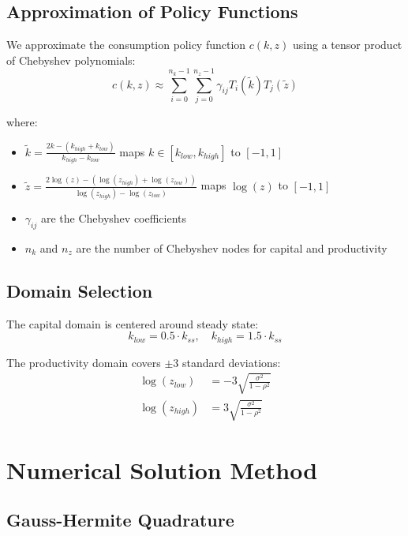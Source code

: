 \documentclass[11pt]{article}
\theoremstyle{definition}
\begin{document}
\subsection{Approximation of Policy Functions}

We approximate the consumption policy function $c(k, z)$ using a tensor product of Chebyshev polynomials:
\begin{equation}
c(k, z) \approx \sum_{i=0}^{n_k-1} \sum_{j=0}^{n_z-1} \gamma_{ij} T_i(\tilde{k}) T_j(\tilde{z})
\end{equation}

where:
\begin{itemize}[leftmargin=*, itemsep=0.1em]
\item $\tilde{k} = \frac{2k - (k_{high} + k_{low})}{k_{high} - k_{low}}$ maps $k \in [k_{low}, k_{high}]$ to $[-1, 1]$
\item $\tilde{z} = \frac{2\log(z) - (\log(z_{high}) + \log(z_{low}))}{\log(z_{high}) - \log(z_{low})}$ maps $\log(z)$ to $[-1, 1]$
\item $\gamma_{ij}$ are the Chebyshev coefficients
\item $n_k$ and $n_z$ are the number of Chebyshev nodes for capital and productivity
\end{itemize}

\subsection{Domain Selection}

The capital domain is centered around steady state:
\begin{equation}
k_{low} = 0.5 \cdot k_{ss}, \quad k_{high} = 1.5 \cdot k_{ss}
\end{equation}

The productivity domain covers $\pm 3$ standard deviations:
\begin{align}
\log(z_{low}) &= -3 \sqrt{\frac{\sigma^2}{1-\rho^2}} \\
\log(z_{high}) &= 3 \sqrt{\frac{\sigma^2}{1-\rho^2}}
\end{align}

\section{Numerical Solution Method}

\subsection{Gauss-Hermite Quadrature}
\end{document}
